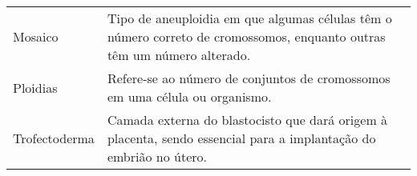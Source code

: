 \begin{flushleft}
\begin{tabularx}{\textwidth}{p{4.5cm} X} %
    Mosaico & Tipo de aneuploidia em que algumas células têm o número correto de cromossomos, enquanto outras têm um número alterado. \\
    Ploidias & Refere-se ao número de conjuntos de cromossomos em uma célula ou organismo. \\
    Trofectoderma & Camada externa do blastocisto que dará origem à placenta, sendo essencial para a implantação do embrião no útero. \\
\end{tabularx}

\end{flushleft}
